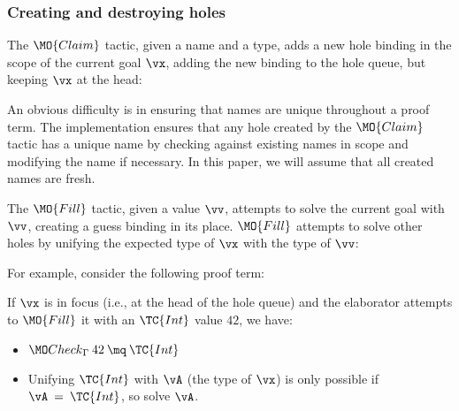 \subsubsection{Creating and destroying holes}

The $\MO{Claim}$ tactic, given a name and a type, adds a new hole binding in
the scope of the current goal $\vx$, adding the new binding to the hole queue, but
keeping $\vx$ at the head:


An obvious difficulty is in ensuring that names are unique throughout a proof term.
The implementation ensures that any hole created by the $\MO{Claim}$ tactic
has a unique name by checking against existing names in scope and modifying
the name if necessary. In this paper, we will assume that all created names are fresh.

The $\MO{Fill}$ tactic, given a value $\vv$, attempts to solve the current goal
with $\vv$, creating a guess binding in its place. $\MO{Fill}$ attempts to
solve other holes by unifying the expected type of $\vx$ with the type of $\vv$:


\noindent
For example, consider the following proof term:

\DM{
\AR{
\hole{\vA}{\Type}\SC\hole{\vk}{\Nat}\SC
\hole{\vx}{\vA}\SC\hole{\vxs}{\Vect\:\vA\:\vk}\SC
\\
\hole{\vys}{\Vect\:\vA\:(\suc\:\vk)}\SC\vys
}
}

\noindent
If $\vx$ is in focus (i.e., at the head of the hole queue) and the elaborator
attempts to
$\MO{Fill}$ it with an $\TC{Int}$ value $42$, we have:

\begin{itemize}
\item $\Check\:42\:\mq\:\TC{Int}$
\item Unifying $\TC{Int}$ with $\vA$ (the type of $\vx$) is only possible if
$\vA\:=\:\TC{Int}$, so solve $\vA$.
\end{itemize}

